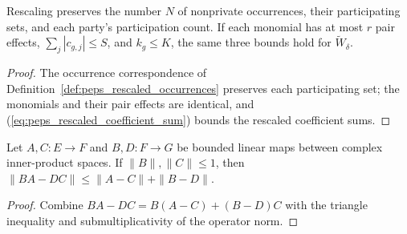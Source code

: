 \begin{lemma}
    \label{thm:peps_rescaled_resources}
    \leanok
    Rescaling preserves the number $N$ of nonprivate occurrences, their
    participating sets, and each party's participation count. If each monomial
    has at most $r$ pair effects, $\sum_j|c_{g,j}|\le S$, and $k_g\le K$, the
    same three bounds hold for $\widetilde W_\delta$.
\end{lemma}
\begin{proof}
    \leanok
    The occurrence correspondence of Definition~\ref{def:peps_rescaled_occurrences}
    preserves each participating set; the monomials and their pair effects are
    identical, and (\ref{eq:peps_rescaled_coefficient_sum}) bounds the rescaled
    coefficient sums.
\end{proof}

\begin{lemma}
    \label{thm:peps_contraction_composition_error}
    \leanok
    Let $A,C:E\to F$ and $B,D:F\to G$ be bounded linear maps between
    complex inner-product spaces. If $\|B\|,\|C\|\le1$, then
    $\|BA-DC\|\le\|A-C\|+\|B-D\|$.
\end{lemma}
\begin{proof}
    \leanok
    Combine $BA-DC=B(A-C)+(B-D)C$ with the triangle inequality and
    submultiplicativity of the operator norm.
\end{proof}


